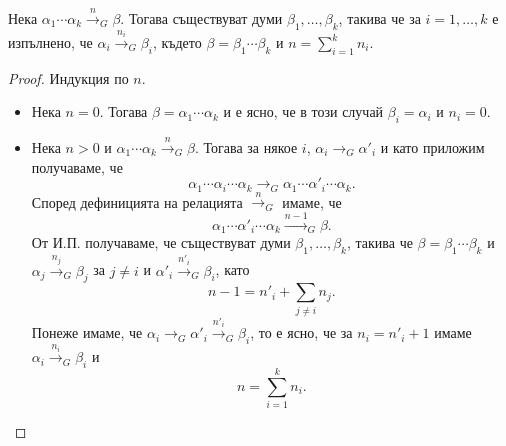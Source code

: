\begin{framed}
  \begin{proposition}
    \label{pr:grammar:divide}
    Нека $\alpha_1\cdots \alpha_k \stackrel{n}{\to}_G \beta$.
    Тогава съществуват думи $\beta_1,\dots,\beta_k$, такива че за $i = 1,\dots, k$ е изпълнено, че
    $\alpha_i \stackrel{n_i}{\to}_G \beta_i$, където $\beta = \beta_1\cdots \beta_k$ и $n = \sum^k_{i = 1}n_i$.
  \end{proposition}
\end{framed}
\begin{proof}
  Индукция по $n$.
  \begin{itemize}
  \item
    Нека $n = 0$. Тогава $\beta = \alpha_1 \cdots \alpha_k$ и е ясно, че в този случай $\beta_i = \alpha_i$ и $n_i = 0$.
  \item
    Нека $n > 0$ и $\alpha_1\cdots \alpha_k \stackrel{n}{\to}_G \beta$. Тогава за някое $i$, $\alpha_i \to_G \alpha'_i$ и
    като приложим  получаваме, че
    \[\alpha_1\cdots\alpha_i\cdots\alpha_k \to_G \alpha_1\cdots\alpha'_i\cdots\alpha_k.\]
    Според дефиницията на релацията $\stackrel{n}{\to}_G$ имаме, че
    \[\alpha_1\cdots\alpha'_i\cdots\alpha_k \stackrel{n-1}{\to}_G \beta.\]
    От И.П. получаваме, че съществуват думи $\beta_1,\dots,\beta_k$, такива че $\beta = \beta_1 \cdots \beta_k$
    и $\alpha_j \stackrel{n_j}{\to}_G \beta_j$ за $j \neq i$ и $\alpha'_i \stackrel{n'_i}{\to}_G \beta_i$, като
    \[n-1 = n'_i + \sum_{j\neq i} n_j.\]
    Понеже имаме, че $\alpha_i \to_G \alpha'_i \stackrel{n'_i}{\to}_G \beta_i$,
    то е ясно, че за $n_i = n'_i + 1$ имаме $\alpha_i \stackrel{n_i}{\to}_G \beta_i$ и
    \[n = \sum^{k}_{i=1} n_i.\]
  \end{itemize}
\end{proof}




